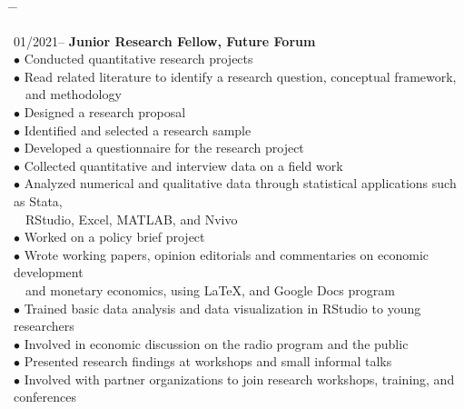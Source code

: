 \documentclass[10pt,a4paper]{article}
\newcommand{\tabbedblock}[1]{

	\begin{tabbing}
		\hspace{3cm} \= \hspace{4cm} \= \kill
		#1
	\end{tabbing}
}
\begin{document}
\tabbedblock{
	01/2021--  \> \textbf{Junior Research Fellow, Future Forum} \\
						\> $\bullet$ Conducted quantitative research projects \\
						\> $\bullet$ Read related literature to identify a research question, conceptual framework, \\
						\> $\color{white}{\bullet}$ and methodology \\
						\> $\bullet$ Designed a research proposal \\
						\> $\bullet$ Identified and selected a research sample \\
						\> $\bullet$ Developed a questionnaire for the research project \\
						\> $\bullet$ Collected quantitative and interview data on a field work \\
						\> $\bullet$ Analyzed numerical and qualitative data through statistical applications such as Stata, \\
						\> $\color{white}{\bullet}$ RStudio, Excel, MATLAB, and Nvivo \\
						\> $\bullet$ Worked on a policy brief project \\
						\> $\bullet$ Wrote working papers, opinion editorials and commentaries on economic development \\
						\> $\color{white}{\bullet}$ and monetary economics, using \LaTeX, and Google Docs program\\
						\> $\bullet$ Trained basic data analysis and data visualization in RStudio to young researchers \\
						\> $\bullet$ Involved in economic discussion on the radio program and the public \\
						\> $\bullet$ Presented research findings at workshops and small informal talks \\
						\> $\bullet$ Involved with partner organizations to join research workshops, training, and conferences \\

						
						
}
\end{document}
